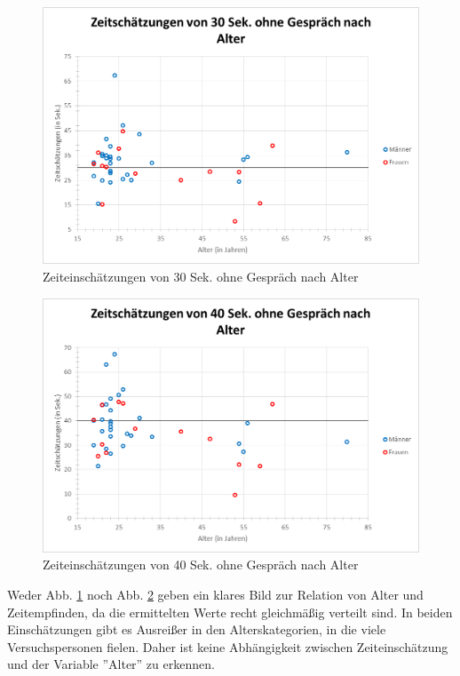 \documentclass{Paper}
\begin{document}
\begin{figure}[H]
	\centering
	\includegraphics[scale=0.7]{../Diagramme/scatterPre/30ohne_alter.png}
	\caption{Zeiteinschätzungen von 30 Sek. ohne Gespräch nach Alter}
	\label{img:alter30ohne}
\end{figure}

\begin{figure}[H]
	\centering
	\includegraphics[scale=0.7]{../Diagramme/scatterPre/40ohne_alter.png}
	\caption{Zeiteinschätzungen von 40 Sek. ohne Gespräch nach Alter}
	\label{img:alter40ohne}
\end{figure}


Weder Abb. \ref{img:alter30ohne} noch Abb. \ref{img:alter40ohne} geben ein klares Bild zur Relation von Alter und Zeitempfinden, da die ermittelten Werte recht gleichmäßig verteilt sind. In beiden Einschätzungen gibt es Ausreißer in den Alterskategorien, in die viele Versuchspersonen fielen. Daher ist keine Abhängigkeit zwischen Zeiteinschätzung und der Variable ''Alter'' zu erkennen. %
\end{document}
